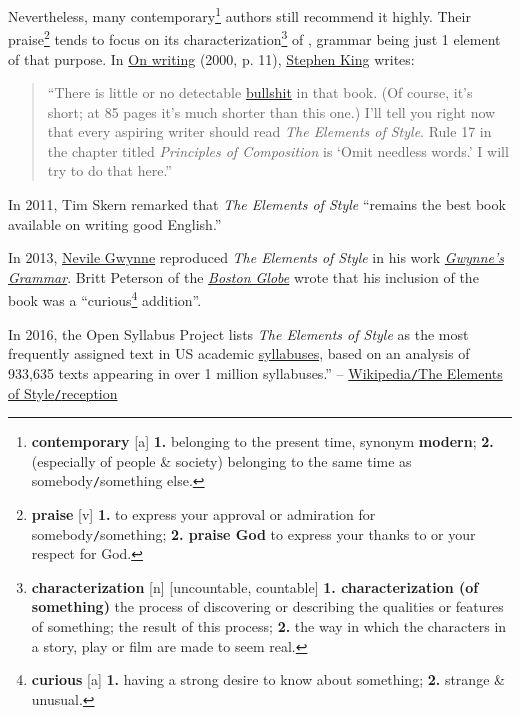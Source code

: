 \documentclass{article}
\begin{document}
Nevertheless, many contemporary\footnote{{\bf contemporary} [a] {\bf 1.} belonging to the present time, {\sc synonym} {\bf modern}; {\bf 2.} (especially of people \& society) belonging to the same time as somebody{\tt/}something else.} authors still recommend it highly. Their praise\footnote{{\bf praise} [v] {\bf 1.} to express your approval or admiration for somebody{\tt/}something; {\bf 2. praise God} to express your thanks to or your respect for God.} tends to focus on its characterization\footnote{{\bf characterization} [n] [uncountable, countable] {\bf 1. characterization (of something)} the process of discovering or describing the qualities or features of something; the result of this process; {\bf 2.} the way in which the characters in a story, play or film are made to seem real.} of , grammar being just 1 element of that purpose. In \href{https://en.wikipedia.org/wiki/On_Writing:_A_Memoir_of_the_Craft}{On writing} (2000, p. 11), \href{https://en.wikipedia.org/wiki/Stephen_King}{Stephen King} writes:
\begin{quotation}
	``There is little or no detectable \href{https://en.wikipedia.org/wiki/Bullshit}{bullshit} in that book. (Of course, it's short; at 85 pages it's much shorter than this one.) I'll tell you right now that every aspiring writer should read {\it The Elements of Style}. Rule 17 in the chapter titled {\it Principles of Composition} is `Omit needless words.' I will try to do that here.''
\end{quotation}
In 2011, Tim Skern remarked that {\it The Elements of Style} ``remains the best book available on writing good English.''

In 2013, \href{https://en.wikipedia.org/wiki/Nevile_Gwynne}{Nevile Gwynne} reproduced {\it The Elements of Style} in his work \href{https://en.wikipedia.org/wiki/Gwynne%27s_Grammar}{{\it Gwynne's Grammar}}. Britt Peterson of the \href{https://en.wikipedia.org/wiki/Boston_Globe}{{\it Boston Globe}} wrote that his inclusion of the book was a ``curious\footnote{{\bf curious} [a] {\bf 1.} having a strong desire to know about something; {\bf 2.} strange \& unusual.} addition''.

In 2016, the Open Syllabus Project lists {\it The Elements of Style} as the most frequently assigned text in US academic \href{https://en.wikipedia.org/wiki/Syllabus}{syllabuses}, based on an analysis of 933,635 texts appearing in over 1 million syllabuses.'' -- \href{https://en.wikipedia.org/wiki/The_Elements_of_Style#Reception}{Wikipedia{\tt/}The Elements of Style{\tt/}reception}
\end{document}
